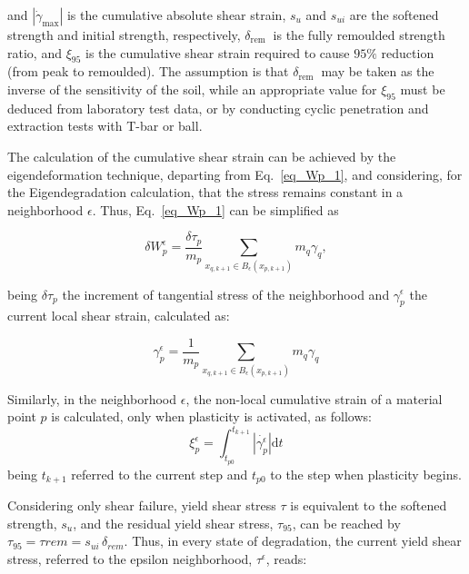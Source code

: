\documentclass[applsci,journal,article,submit,moreauthors,pdftex]{Definitions/mdpi}
\begin{document}
and $\left|\dot{\gamma}_{\max }\right|$ is the cumulative absolute shear strain, $s_{u}$ and $s_{u i}$ are the softened strength and initial strength, respectively, $\delta_{\text {rem }}$ is the fully remoulded strength ratio, and $\xi_{95}$ is the cumulative shear strain required to cause $95 \%$ reduction (from peak to remoulded). The assumption is that $\delta_{\text {rem }}$ may be taken as the inverse of the sensitivity of the soil, while an appropriate value for $\xi_{95}$ must be deduced from laboratory test data, or by conducting cyclic penetration and extraction tests with T-bar or ball.

The calculation of the cumulative shear strain can be achieved by the eigendeformation technique, departing from Eq.~\eqref{eq_Wp_1}, and considering, for the Eigendegradation calculation, that the stress remains constant in a neighborhood $\epsilon$. Thus, Eq.~\eqref{eq_Wp_1} can be simplified as

\begin{equation}\label{eq_Wp_4}
\delta W^\epsilon_{p}=\frac{\delta \tau_p} {m_{p}} \sum_{x_{q,k+1}\in B_\epsilon (x_{p,k+1})} m_q \gamma_{q},
\end{equation}

being $\delta \tau_p$ the increment of tangential stress of the neighborhood and $\gamma^{\epsilon}_{p}$ the current local shear strain, calculated as:

\begin{equation}\label{eq_Wp_5}
\gamma^{\epsilon}_{p}=\frac{1}{m_{p}}\sum_{x_{q,k+1}\in B_\epsilon (x_{p,k+1})}m_q \gamma_{q}
\end{equation}

Similarly, in the neighborhood $\epsilon$, the non-local cumulative strain of a material point $p$ is calculated, only when plasticity is activated, as follows:
\begin{equation}\label{eq18}
\xi^{\epsilon}_{p}=\int^{t_{k+1}}_{t_{p0}}\left|\dot{\gamma^{\epsilon}_{p}}\right| \mathrm{d} t
\end{equation}
being $t_{k+1}$ referred to the current step and $t_{p0}$ to the step when plasticity begins. 

Considering only shear failure, yield shear stress $\tau$ is equivalent to the softened strength, $s_u$, and the residual yield shear stress, $\tau_{95}$, can be reached by $\tau_{95}=\tau{rem}=s_{ui} \, \delta_{rem}$. Thus, in every state of degradation, the current yield shear stress, referred to the epsilon neighborhood, $\tau^{\epsilon}$, reads:
\end{document}
